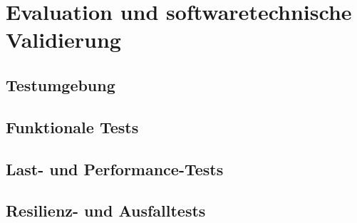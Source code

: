 \chapter{Evaluation und softwaretechnische Validierung}

\section{Testumgebung}

\section{Funktionale Tests}

\section{Last- und Performance-Tests}

\section{Resilienz- und Ausfalltests}
